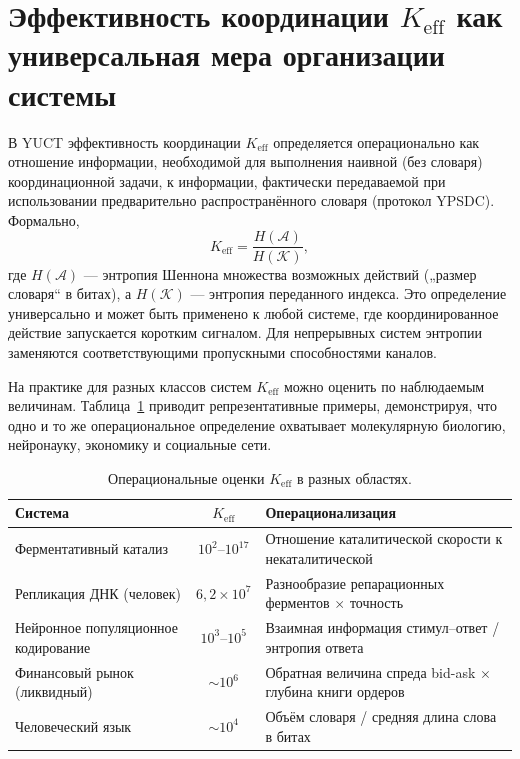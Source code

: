 \documentclass[11pt]{article}
\theoremstyle{remark}
\newcommand{\Keff}{K_{\mathrm{eff}}}
\begin{document}
	\section{Эффективность координации \texorpdfstring{\(\Keff\)}{Keff} как универсальная мера организации системы}
	\label{sec:keff}
	
	В YUCT эффективность координации \(\Keff\) определяется операционально как отношение информации, необходимой для выполнения наивной (без словаря) координационной задачи, к информации, фактически передаваемой при использовании предварительно распространённого словаря (протокол YPSDC). Формально,
	\begin{equation}
		\Keff = \frac{H(\mathcal{A})}{H(\mathcal{K})},
	\end{equation}
	где \(H(\mathcal{A})\) — энтропия Шеннона множества возможных действий („размер словаря“ в битах), а \(H(\mathcal{K})\) — энтропия переданного индекса. Это определение универсально и может быть применено к любой системе, где координированное действие запускается коротким сигналом. Для непрерывных систем энтропии заменяются соответствующими пропускными способностями каналов.
	
	На практике для разных классов систем \(\Keff\) можно оценить по наблюдаемым величинам. Таблица~\ref{tab:keff_examples} приводит репрезентативные примеры, демонстрируя, что одно и то же операциональное определение охватывает молекулярную биологию, нейронауку, экономику и социальные сети.
	
	\begin{table}[H]
		\centering
		\caption{Операциональные оценки \(\Keff\) в разных областях.}
		\label{tab:keff_examples}
		\begin{tabular}{l c l}
			\toprule
			\textbf{Система} & \(\Keff\) & \textbf{Операционализация} \\
			\midrule
			Ферментативный катализ & \(10^2\)–\(10^{17}\) & Отношение каталитической скорости к некаталитической \\
			Репликация ДНК (человек) & \(6,2\times10^7\) & Разнообразие репарационных ферментов \(\times\) точность \\
			Нейронное популяционное кодирование & \(10^3\)–\(10^5\) & Взаимная информация стимул–ответ / энтропия ответа \\
			Финансовый рынок (ликвидный) & \(\sim 10^6\) & Обратная величина спреда bid-ask \(\times\) глубина книги ордеров \\
			Человеческий язык & \(\sim 10^4\) & Объём словаря / средняя длина слова в битах \\
			\bottomrule
		\end{tabular}
	\end{table}
	
\end{document}
